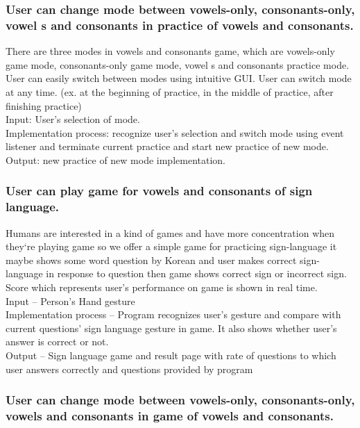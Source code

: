 \documentclass[10pt,journal,compsoc]{IEEEtran}
\begin{document}
\subsubsection{User can change mode between  vowels-only, consonants-only, vowel s and consonants in practice of vowels and consonants.\\}
There are three modes in vowels and consonants game, which are vowels-only game mode, consonants-only game mode, vowel s and consonants practice mode. User can easily switch between modes using intuitive GUI. User can switch mode at any time.
(ex. at the beginning of practice, in the middle of practice, after finishing practice)
\\Input: User’s selection of mode.
\\Implementation process: recognize user’s selection and switch mode using event listener and terminate current practice and start new practice of new mode. 
\\Output: new practice of new mode implementation.


\subsubsection{User can play game for vowels and consonants of sign language.\\}

Humans are interested in a kind of games and have more concentration when they`re playing game so we offer a simple game for practicing sign-language it maybe shows some word question by Korean and user makes correct sign-language in response to question then game shows correct sign or incorrect sign.
Score which represents user’s performance on game is shown in real time.
\\Input – Person's Hand gesture
\\Implementation process – Program recognizes user’s gesture and compare with current questions’ sign language gesture in game. It also shows whether user’s answer is correct or not.
\\Output – Sign language game and result page with rate of questions to which user answers correctly and questions provided by program




\subsubsection{User can change mode between  vowels-only, consonants-only, vowels and consonants in game of vowels and consonants.\\}
\end{document}
